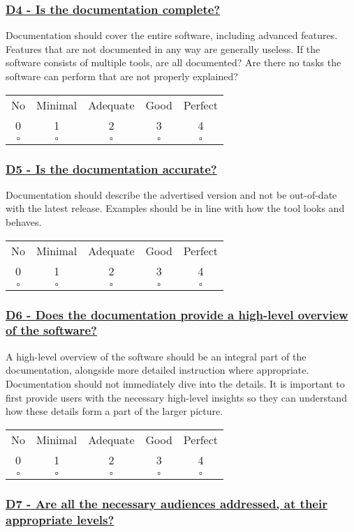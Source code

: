 \documentclass[a4paper,11pt]{article}
\newcommand{\criterion}[2]{\subsubsection*{\underline{#1 - #2}}\label{id:#1}}
\newcommand\CheckTable{%
  \begin{tabular}{ccccc}
    No & Minimal & Adequate & Good & Perfect \\
    0 & 1 & 2 & 3 & 4 \\
    \hline
    $\square$ & $\square$ & $\square$ & $\square$ & $\square$ \\
  \end{tabular}%
}
\begin{document}
\newcommand{\dFourID}{D4}
\newcommand{\dFourText}{Is the documentation complete?}
\criterion{\dFourID}{\dFourText}

Documentation should cover the entire software, including advanced features.
Features that are not documented in any way are generally useless. If the
software consists of multiple tools, are all documented? Are there no tasks the
software can perform that are not properly explained?

%
%
%

\CheckTable

\newcommand{\dFiveID}{D5}
\newcommand{\dFiveText}{Is the documentation accurate?}
\criterion{\dFiveID}{\dFiveText}

Documentation should describe the advertised version and not be out-of-date
with the latest release. Examples should be in line with how the tool looks and
behaves.

\CheckTable

\newcommand{\dSixID}{D6}
\newcommand{\dSixText}{Does the documentation provide a high-level overview of the software?}
\criterion{\dSixID}{\dSixText}

A high-level overview of the software should be an integral part of the
documentation, alongside more detailed instruction where appropriate.
Documentation should not immediately dive into the details. It is important to
first provide users with the necessary high-level insights so they can understand how
these details form a part of the larger picture.


\CheckTable

\newcommand{\dSevenID}{D7}
\newcommand{\dSevenText}{Are all the necessary audiences addressed, at their appropriate levels?}
\criterion{\dSevenID}{\dSevenText}
\end{document}
